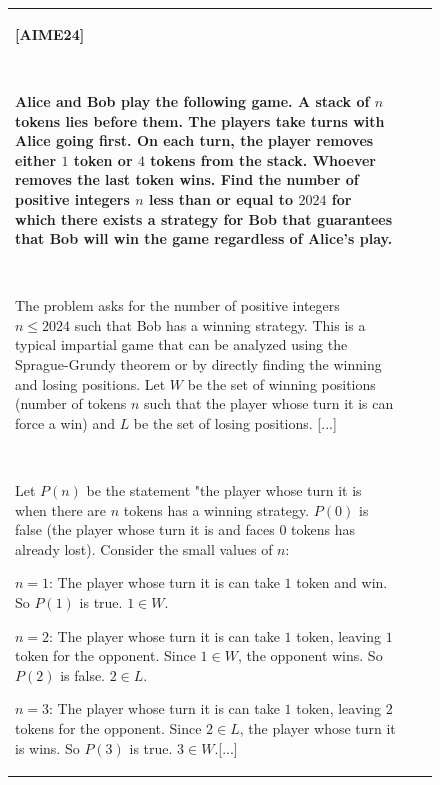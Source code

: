 \documentclass{article}
\theoremstyle{plain}
\theoremstyle{definition}
\theoremstyle{remark}
\begin{document}
\begin{figure}[p]
\footnotesize
\centering
\begin{tabular}{@{}p{}p{}p{}@{}}
\textbf{[AIME24]}

~

\textbf{Alice and Bob play the following game. A stack of $n$ tokens lies before them. The players take turns with Alice going first. On each turn, the player removes either $1$ token or $4$ tokens from the stack. Whoever removes the last token wins. Find the number of positive integers $n$ less than or equal to $2024$ for which there exists a strategy for Bob that guarantees that Bob will win the game regardless of Alice's play.
}

~ 

\textcolor{defaultlightblue}{
The problem asks for the number of positive integers $n \le 2024$ such that Bob has a winning strategy. This is a typical impartial game that can be analyzed using the Sprague-Grundy theorem or by directly finding the winning and losing positions. Let $W$ be the set of winning positions (number of tokens $n$ such that the player whose turn it is can force a win) and $L$ be the set of losing positions. \textcolor[HTML]{808080}{[...]}
}

~

\textcolor{defaultlightblue}{
Let $P(n)$ be the statement "the player whose turn it is when there are $n$ tokens has a winning strategy. $P(0)$ is false (the player whose turn it is and faces $0$ tokens has already lost).
Consider the small values of $n$:}


\textcolor{defaultlightblue}{
$n=1$: The player whose turn it is can take $1$ token and win. So $P(1)$ is true. $1 \in W$.}

\textcolor{defaultlightblue}{
$n=2$: The player whose turn it is can take $1$ token, leaving $1$ token for the opponent. Since $1 \in W$, the opponent wins. So $P(2)$ is false. $2 \in L$.}


\textcolor{defaultlightblue}{
$n=3$: The player whose turn it is can take $1$ token, leaving $2$ tokens for the opponent. Since $2 \in L$, the player whose turn it is wins. So $P(3)$ is true. $3 \in W$.\textcolor[HTML]{808080}{[...]}}



\end{tabular}
\end{figure}
\end{document}
